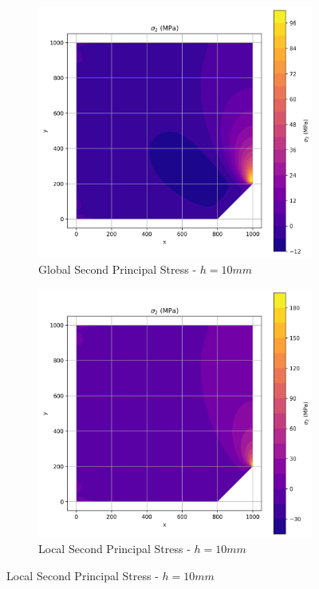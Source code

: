\begin{figure}[H]
  \centering
  \begin{subfigure}[b]{0.45\textwidth}
    \centering
    \includegraphics[width=\textwidth]{GRAFICOS/Quad9/1.25mm_global/resultados - sigma_2.png}
    \caption{Global Second Principal Stress - $h=10mm$}
    \label{fig:img13}
  \end{subfigure}
  \hfill
  \begin{subfigure}[b]{0.45\textwidth}
    \centering
    \includegraphics[width=\textwidth]{GRAFICOS/Quad9/1.25mm_local/resultados - sigma_2.png}
    \caption{Local Second Principal Stress - $h=10mm$}
    \label{fig:img23}
  \end{subfigure}
\end{figure}

